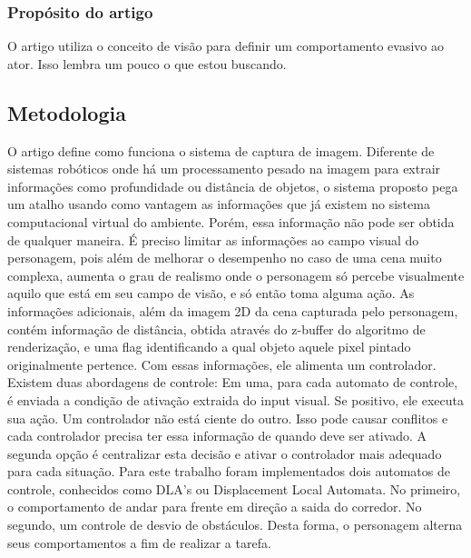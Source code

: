 \subsubsection{Propósito do artigo}
O artigo utiliza o conceito de visão para definir um comportamento evasivo ao ator. Isso lembra um pouco o que estou buscando.

\subsection{Metodologia}

O artigo define como funciona o sistema de captura de imagem. Diferente de sistemas robóticos onde há um processamento pesado na imagem para extrair informações como profundidade ou distância de objetos, o sistema proposto pega um atalho usando como vantagem as informações que já existem no sistema computacional virtual do ambiente. Porém, essa informação não pode ser obtida de qualquer maneira. É preciso limitar as informações ao campo visual do personagem, pois além de melhorar o desempenho no caso de uma cena muito complexa, aumenta o grau de realismo onde o personagem só percebe visualmente aquilo que está em seu campo de visão, e só então toma alguma ação.
As informações adicionais, além da imagem 2D da cena capturada pelo personagem, contém informação de distância, obtida através do z-buffer do algoritmo de renderização, e uma flag identificando a qual objeto aquele pixel pintado originalmente pertence.
Com essas informações, ele alimenta um controlador. Existem duas abordagens de controle: Em uma, para cada automato de controle, é enviada a condição de ativação extraida do input visual. Se positivo, ele executa sua ação. Um controlador não está ciente do outro. Isso pode causar conflitos e cada controlador precisa ter essa informação de quando deve ser ativado. A segunda opção é centralizar esta decisão e ativar o controlador mais adequado para cada situação.
Para este trabalho foram implementados dois automatos de controle, conhecidos como DLA's ou Displacement Local Automata. No primeiro, o comportamento de andar para frente em direção a saida do corredor. No segundo, um controle de desvio de obstáculos.
Desta forma, o personagem alterna seus comportamentos a fim de realizar a tarefa.

